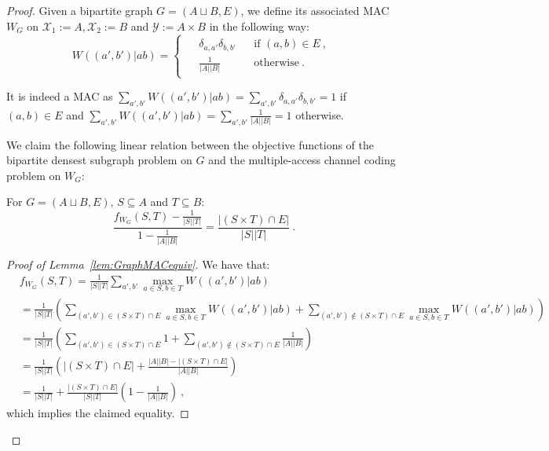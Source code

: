 \begin{proof}
Given a bipartite graph $G = (A \sqcup B, E)$, we define its associated MAC $W_G$ on $\mathcal{X}_1:=A, \mathcal{X}_2:=B$ and $\mathcal{Y}:= A \times B$ in the following way:
\begin{equation}
  W((a',b')|ab) = \begin{cases}
      \begin{aligned}
      &\delta_{a,a'}\delta_{b,b'} &&\text{if } (a,b) \in E \ ,\\
      &\frac{1}{|A||B|} &&\text{otherwise} \ .
      \end{aligned}
\end{cases}
\end{equation}

It is indeed a MAC as $\sum_{a',b'}W((a',b')|ab) = \sum_{a',b'} \delta_{a,a'}\delta_{b,b'} = 1$ if $(a,b) \in E$ and $\sum_{a',b'}W((a',b')|ab) = \sum_{a',b'}\frac{1}{|A||B|} = 1$ otherwise.

We claim the following linear relation between the objective functions of the bipartite densest subgraph problem on $G$ and the multiple-access channel coding problem on $W_G$:
\begin{lemma}
  \label{lem:GraphMACequiv}
  For $G=(A \sqcup B,E)$, $S \subseteq A$ and $T \subseteq B$:
  \[ \frac{f_{W_G}(S,T) - \frac{1}{|S||T|}}{1-\frac{1}{|A||B|}}  = \frac{|(S \times T) \cap E|}{|S||T|} \ .\]
\end{lemma}

\begin{proof}[Proof of Lemma~\ref{lem:GraphMACequiv}]
We have that:
\begin{equation}
  \begin{aligned}
    &f_{W_G}(S,T) = \frac{1}{|S||T|}\sum_{a',b'} \max_{a \in S, b \in T} W((a',b')|ab)\\
    &= \frac{1}{|S||T|}\left(\sum_{(a',b') \in (S \times T) \cap E} \max_{a \in S, b \in T} W((a',b')|ab) + \sum_{(a',b') \not\in (S \times T) \cap E} \max_{a \in S, b \in T} W((a',b')|ab)\right)\\
    &= \frac{1}{|S||T|}\left(\sum_{(a',b') \in (S \times T) \cap E} 1 + \sum_{(a',b') \not\in (S \times T) \cap E} \frac{1}{|A||B|}\right)\\
    &= \frac{1}{|S||T|}\left(|(S \times T) \cap E| + \frac{|A||B|-|(S \times T) \cap E|}{|A||B|}\right)\\
    &= \frac{1}{|S||T|} + \frac{|(S \times T) \cap E|}{|S||T|}\left(1-\frac{1}{|A||B|}\right) \ ,
  \end{aligned}
\end{equation}
which implies the claimed equality.
\end{proof}


\end{proof}
